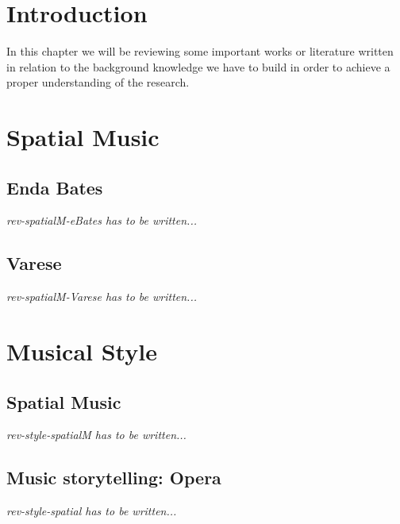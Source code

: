 \documentclass[letterpaper, openright]{report}
\begin{document}
	\section{Introduction} %
	\label{sub:rev-intro}
In this chapter we will be reviewing some important works or literature written in relation to the background knowledge we have to build in order to achieve a proper understanding of the research.
    
    \section{Spatial Music} %
	\label{sub:rev-spatialM}

			\subsection{Enda Bates} %
			\label{subsub:rev-spatialM-eBates}
\textit{rev-spatialM-eBates has to be written...}

			\subsection{Varese} %
			\label{subsub:rev-spatialM-Varese}
\textit{rev-spatialM-Varese has to be written...}
            

    \section{Musical Style} %
	\label{sub:rev-style}
    
			\subsection{Spatial Music} %
			\label{subsub:rev-style-spatialM}
\textit{rev-style-spatialM has to be written...}
            
            \subsection{Music storytelling: Opera} %
			\label{subsub:rev-style-opera}
\textit{rev-style-spatial has to be written...}
            
\end{document}
